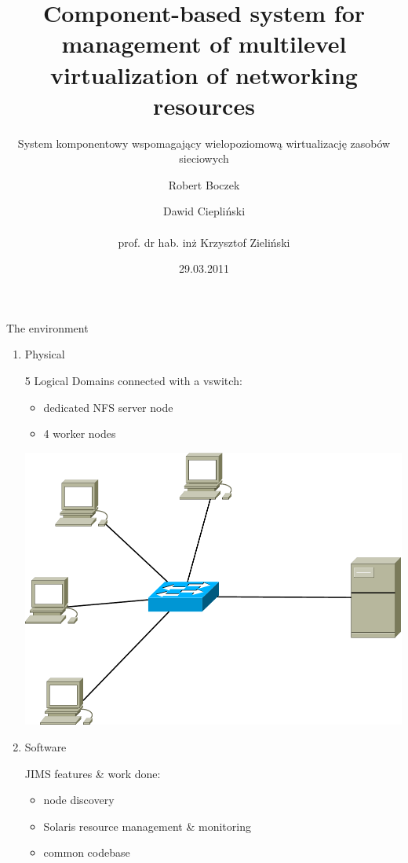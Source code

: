 \documentclass{beamer}
\title{Component-based system for management of multilevel virtualization of networking resources}
\subtitle{System komponentowy wspomagający wielopoziomową wirtualizację zasobów sieciowych}
\author{Robert Boczek \and Dawid Ciepliński \\ ~ \\ prof. dr hab. inż Krzysztof Zieliński}
\date{29.03.2011}
\begin{document}
	\begin{frame}
		\titlepage
	\end{frame}


	\begin{frame}{The environment}

		\begin{enumerate}

			\item Physical

				5 Logical Domains connected with a vswitch:

				\begin{itemize}
					\item dedicated NFS server node
					\item 4 worker nodes
				\end{itemize}

				\includegraphics[scale=.2]{img/env.pdf}



			\item Software

				JIMS features \& work done:

				\begin{itemize}
					\item node discovery
					\item Solaris resource management \& monitoring
					\item common codebase
				\end{itemize}
		
		\end{enumerate}

	\end{frame}
\end{document}
